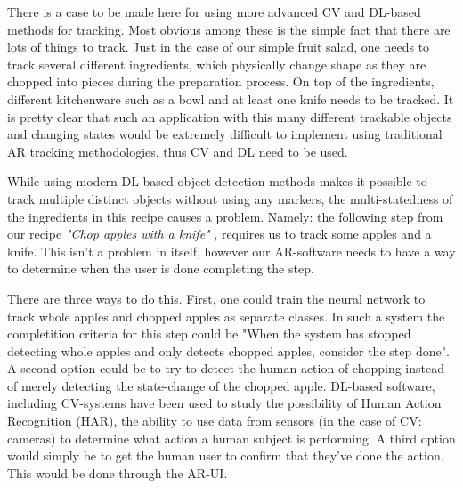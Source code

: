	There is a case to be made here for using more advanced CV and DL-based 
methods for tracking. Most obvious among these is the simple fact that there 
are lots of things to track. Just in the case of our simple fruit salad, one 
needs to track several different ingredients, which physically change shape as 
they are chopped into pieces during the preparation process. On top of the 
ingredients, different kitchenware such as a bowl and at least one knife needs 
to be tracked. It is pretty clear that such an application with this many 
different trackable objects and changing states would be extremely difficult 
to implement using traditional AR tracking methodologies, thus CV and DL need 
to be used. \par
	While using modern DL-based object detection methods makes it possible 
to track multiple distinct objects without using any markers\cite{ghasemi}, 
the multi-statedness of the ingredients in this recipe causes a problem. 
Namely: the following step from our recipe \textit{"Chop apples with a knife"}
, requires us to track some apples and a knife. This isn't a problem in 
itself, however our AR-software needs to have a way to determine when the 
user is done completing the step.\par
	There are three ways to do this. First, one could train the neural 
network to track whole apples and chopped apples as separate classes. In such 
a system the completition criteria for this step could be "When the system 
has stopped detecting whole apples and only detects chopped apples, consider 
the step done". A second option could be to try to detect the human action of 
chopping instead of merely detecting the state-change of the chopped apple. 
DL-based software, including CV-systems have been used to study the 
possibility of Human Action Recognition (HAR), the ability to use data from 
sensors (in the case of CV: cameras) to determine what action a human subject 
is performing.\cite{sedaghati2025} A third option would simply be to get the 
human user to confirm that they've done the action. This would be done through 
the AR-UI.
